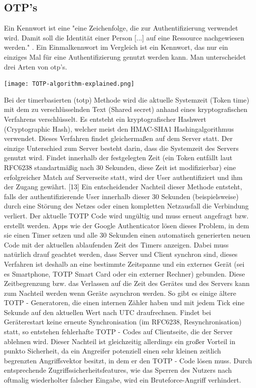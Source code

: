 \subsection{OTP's}
Ein Kennwort ist eine "eine Zeichenfolge, die zur Authentifizierung verwendet wird. Damit soll die Identität einer Person [...] auf eine Ressource nachgewiesen werden." \cite{A4}. Ein Einmalkennwort im Vergleich ist ein Kennwort, das nur ein einziges Mal für eine Authentifizierung genutzt werden kann. Man unterscheidet drei Arten von \ac{otp}'s.

\texttt{[image: TOTP-algorithm-explained.png]}

Bei der timerbasierten (\ac{totp}) Methode wird die aktuelle Systemzeit (Token time) mit dem zu verschlüsselnden Text (Shared secret) anhand eines kryptografischen Verfahrens verschlüsselt. Es entsteht ein kryptografischer Hashwert (Cryptographic Hash), welcher meist den HMAC-SHA1 Hashingalgorithmus verwendet. Dieses Verfahren findet gleichermaßen auf dem Server statt. Der einzige Unterschied zum Server besteht darin, dass die Systemzeit des Servers genutzt wird. Findet innerhalb der festgelegten Zeit (ein Token entfällt laut RFC6238 standartmäßig nach 30 Sekunden, diese Zeit ist modifizierbar) eine erfolgreicher Match auf Serverseite statt, wird der User authentifiziert und ihm der Zugang gewährt. [13] Ein entscheidender Nachteil dieser Methode entsteht, falls der authentifizierende User innerhalb dieser 30 Sekunden (beispielsweise) durch eine Störung des Netzes oder einen kompletten Netzausfall die Verbindung verliert. Der aktuelle TOTP Code wird ungültig und muss erneut angefragt bzw. erstellt werden. Apps wie der Google Authenticator lösen dieses Problem, in dem sie einen Timer setzen und alle 30 Sekunden einen automatisch generierten neuen Code mit der aktuellen ablaufenden Zeit des Timers anzeigen. Dabei muss natürlich drauf geachtet werden, dass Server und Client synchron sind, dieses Verfahren ist deshalb an eine bestimmte Zeitspanne und ein externes Gerät (sei es Smartphone, TOTP Smart Card oder ein externer Rechner) gebunden. Diese Zeitbegrenzung bzw. das Verlassen auf die Zeit des Gerätes und des Servers kann zum Nachteil werden wenn Geräte asynchron werden. So gibt es einige ältere TOTP - Generatoren, die einen internen Zähler haben und mit jedem Tick eine Sekunde auf den aktuellen Wert nach UTC draufrechnen. Findet bei Geräterestart keine erneute Synchronisation (im RFC6238, Resynchronisation) statt, so entstehen fehlerhafte TOTP - Codes auf Clientseite, die der Server ablehnen wird. Dieser Nachteil ist gleichzeitig allerdings ein großer Vorteil in punkto Sicherheit, da ein Angreifer potenziell einen sehr kleinen zeitlich begrenzten Angriffsvektor besitzt, in dem er den TOTP - Code lösen muss. Durch entsprechende Zugriffssicherheitsfeatures, wie das Sperren des Nutzers nach oftmalig wiederholter falscher Eingabe, wird ein Bruteforce-Angriff verhindert.

